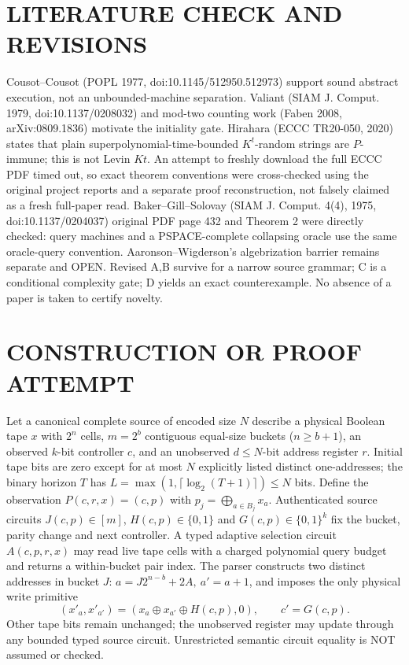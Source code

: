 \documentclass[11pt]{article}
\begin{document}
\section{LITERATURE CHECK AND REVISIONS}
Cousot--Cousot (POPL 1977, doi:10.1145/512950.512973) support sound abstract execution, not an unbounded-machine separation. Valiant (SIAM J. Comput. 1979, doi:10.1137/0208032) and mod-two counting work (Faben 2008, arXiv:0809.1836) motivate the initiality gate. Hirahara (ECCC TR20-050, 2020) states that plain superpolynomial-time-bounded $K^t$-random strings are $P$-immune; this is not Levin $Kt$. An attempt to freshly download the full ECCC PDF timed out, so exact theorem conventions were cross-checked using the original project reports and a separate proof reconstruction, not falsely claimed as a fresh full-paper read. Baker--Gill--Solovay (SIAM J. Comput. 4(4), 1975, doi:10.1137/0204037) original PDF page 432 and Theorem 2 were directly checked: query machines and a PSPACE-complete collapsing oracle use the same oracle-query convention. Aaronson--Wigderson's algebrization barrier remains separate and OPEN. Revised A,B survive for a narrow source grammar; C is a conditional complexity gate; D yields an exact counterexample. No absence of a paper is taken to certify novelty.

\section{CONSTRUCTION OR PROOF ATTEMPT}
Let a canonical complete source of encoded size $N$ describe a physical Boolean tape $x$ with $2^n$ cells, $m=2^b$ contiguous equal-size buckets ($n\ge b+1$), an observed $k$-bit controller $c$, and an unobserved $d\le N$-bit address register $r$. Initial tape bits are zero except for at most $N$ explicitly listed distinct one-addresses; the binary horizon $T$ has $L=\max(1,\lceil\log_2(T+1)\rceil)\le N$ bits. Define the observation $P(c,r,x)=(c,p)$ with $p_j=\bigoplus_{a\in B_j}x_a$. Authenticated source circuits $J(c,p)\in[m]$, $H(c,p)\in\{0,1\}$ and $G(c,p)\in\{0,1\}^k$ fix the bucket, parity change and next controller. A typed adaptive selection circuit $A(c,p,r,x)$ may read live tape cells with a charged polynomial query budget and returns a within-bucket pair index. The parser constructs two distinct addresses in bucket $J$: $a=J2^{n-b}+2A,\ a'=a+1$, and imposes the only physical write primitive
\[
(x'_a,x'_{a'})=(x_a\oplus x_{a'}\oplus H(c,p),0),\qquad c'=G(c,p).
\]
Other tape bits remain unchanged; the unobserved register may update through any bounded typed source circuit. Unrestricted semantic circuit equality is NOT assumed or checked.
\end{document}
